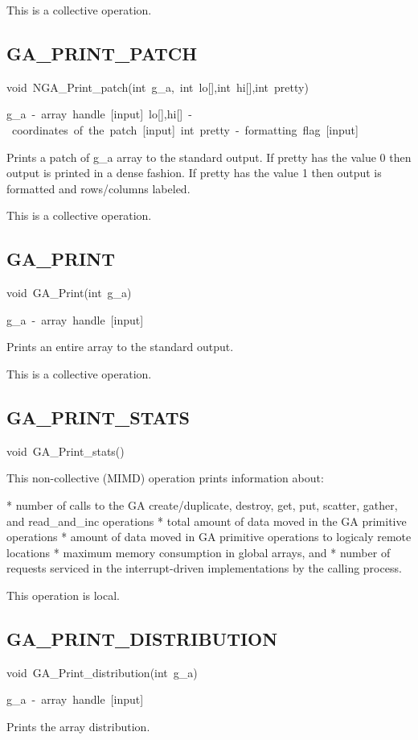 This is a collective operation. 


\subsection*{\label{sub:GA_PRINT_PATCH}GA\_PRINT\_PATCH}
\begin{lyxcode}
void~NGA\_Print\_patch(int~g\_a,~int~lo{[}{]},int~hi{[}{]},int~pretty)

g\_a~-~array~handle~{[}input{]}~lo{[}{]},hi{[}{]}~-~coordinates~of~the~patch~{[}input{]}~int~pretty~-~formatting~flag~{[}input{]}
\end{lyxcode}
Prints a patch of g\_a array to the standard output. If pretty has
the value 0 then output is printed in a dense fashion. If pretty has
the value 1 then output is formatted and rows/columns labeled.

This is a collective operation.


\subsection*{\label{sub:GA_PRINT}GA\_PRINT}
\begin{lyxcode}
void~GA\_Print(int~g\_a)

g\_a~-~array~handle~{[}input{]}
\end{lyxcode}
Prints an entire array to the standard output.

This is a collective operation. 


\subsection*{\label{sub:GA_PRINT_STATS}GA\_PRINT\_STATS}
\begin{lyxcode}
void~GA\_Print\_stats()
\end{lyxcode}
This non-collective (MIMD) operation prints information about:

{*} number of calls to the GA create/duplicate, destroy, get, put,
scatter, gather, and read\_and\_inc operations {*} total amount of
data moved in the GA primitive operations {*} amount of data moved
in GA primitive operations to logicaly remote locations {*} maximum
memory consumption in global arrays, and {*} number of requests serviced
in the interrupt-driven implementations by the calling process.

This operation is local.


\subsection*{\label{sub:GA_PRINT_DISTRIBUTION}GA\_PRINT\_DISTRIBUTION}
\begin{lyxcode}
void~GA\_Print\_distribution(int~g\_a)

g\_a~-~array~handle~{[}input{]}
\end{lyxcode}
Prints the array distribution.

